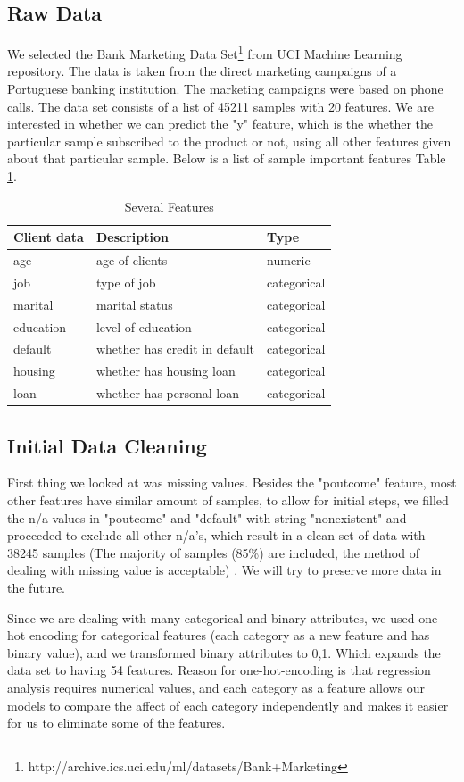 \documentclass{mytemplate}%
\begin{document}
\begin{multicols}{2}
\subsection{Raw Data}
We selected the Bank Marketing Data Set\footnote{http://archive.ics.uci.edu/ml/datasets/Bank+Marketing} from UCI Machine Learning repository. The data is taken from the direct marketing campaigns of a Portuguese banking institution. The marketing campaigns were based on phone calls. The data set consists of a list of 45211 samples with 20 features. We are interested in whether we can predict the "y" feature, which is the whether the particular sample subscribed to the product or not, using all other features given about that particular sample. Below is a list of sample important features {\color{red}Table \ref{t01}}.
\begin{table}[H]
  \centering
  \begin{tabular}{|l|l|l|}
     \hline
Client data & Description&Type \\ \hline
age & age of clients &numeric\\ \hline
 job & type of job&categorical\\ \hline
 marital & marital status&categorical\\ \hline
 education & level of education& categorical\\ \hline
 default & whether has credit in default& categorical\\ \hline
 housing & whether has housing loan& categorical\\ \hline
 loan  &whether has personal loan& categorical \\ \hline
   \end{tabular}
  \caption{Several Features}\label{t01}
\end{table}

\subsection{Initial Data Cleaning}
First thing we looked at was missing values. Besides the "poutcome" feature, most other features have similar amount of samples, to allow for initial steps, we filled the n/a values in "poutcome" and "default" with string "nonexistent" and proceeded to exclude all other n/a's, which result in a clean set of data with 38245 samples (The majority of samples (85\%)  are included, the method of dealing with missing value is acceptable) . We will try to preserve more data in the future.

Since we are dealing with many categorical and binary attributes, we used one hot encoding for categorical features (each category as a new feature and has binary value), and we transformed binary attributes to {0,1}. Which expands the data set to having 54 features. Reason for one-hot-encoding is that regression analysis requires numerical values, and each category as a feature allows our models to compare the affect of each category independently and makes it easier for us to eliminate some of the features.


\end{multicols}
\end{document}
